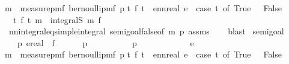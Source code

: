 \begin{isabellebody}
{\isachardoublequoteopen}m\ {\isacharequal}{\kern0pt}\ measure{\isacharunderscore}{\kern0pt}pmf\ {\isacharparenleft}{\kern0pt}bernoulli{\isacharunderscore}{\kern0pt}pmf\ p{}{\isacharparenright}{\kern0pt}{\isachardoublequoteclose}\isanewline
{\isachardoublequoteopen}{\isasymAnd}t{\isachardot}{\kern0pt}\ f\ t\ {\isacharequal}{\kern0pt}\ ennreal\ e\ {\isacharasterisk}{\kern0pt}\ {\isacharparenleft}{\kern0pt}case\ t\ of\ True\ {\isasymRightarrow}\ {}{\isacharbar}{\kern0pt}\ False\ {\isasymRightarrow}\ {}{\isacharparenright}{\kern0pt}{\isachardoublequoteclose}\isanewline
{}\ {\isachardoublequoteopen}{\isasymintegral}\isactrlsup {\isacharplus}{\kern0pt}\ t{\isachardot}{\kern0pt}\ {\isacharparenleft}{\kern0pt}f\ t{\isacharparenright}{\kern0pt}\ {\isasympartial}m\ {\isacharequal}{\kern0pt}\ integral\isactrlsup S\ m\ f{\isachardoublequoteclose}\isanewline
%
\isadelimproof
\ \ %
\endisadelimproof
%
\isatagproof
{}\isamarkupfalse%
\ nn{\isacharunderscore}{\kern0pt}integral{\isacharunderscore}{\kern0pt}eq{\isacharunderscore}{\kern0pt}simple{\isacharunderscore}{\kern0pt}integral\ semi{\isacharunderscore}{\kern0pt}goal{}{}{\isacharunderscore}{\kern0pt}false{\isacharbrackleft}{\kern0pt}of\ m\ p{}{\isacharbrackright}{\kern0pt}\ assms\isanewline
\ \ \isamarkupfalse%
\ blast%
\endisatagproof
{\isafoldproof}%
%
\isadelimproof
\isanewline
%
\endisadelimproof
\isanewline
\isanewline
{}\isamarkupfalse%
\ semi{\isacharunderscore}{\kern0pt}goal{}{\isacharcolon}{\kern0pt}\isanewline
\ \ \ p{}\ e{\isacharcolon}{\kern0pt}{\isacharcolon}{\kern0pt}real\ \ f\isanewline
\ \ \ \ {\isachardoublequoteopen}{}\ {\isasymle}\ p{}{\isachardoublequoteclose}\isanewline
\ \ \ \ \ \ \ \ \ \ {\isachardoublequoteopen}p{}\ {\isasymle}\ {}{\isachardoublequoteclose}\isanewline
\ \ \ \ \ \ \ \ \ \ {\isachardoublequoteopen}e\ {\isasymge}\ {}{\isachardoublequoteclose}\isanewline
{\isachardoublequoteopen}m\ {\isacharequal}{\kern0pt}\ measure{\isacharunderscore}{\kern0pt}pmf\ {\isacharparenleft}{\kern0pt}bernoulli{\isacharunderscore}{\kern0pt}pmf\ p{}{\isacharparenright}{\kern0pt}{\isachardoublequoteclose}\isanewline
{\isachardoublequoteopen}{\isasymAnd}t{\isachardot}{\kern0pt}\ f\ t\ {\isacharequal}{\kern0pt}\ ennreal\ e\ {\isacharasterisk}{\kern0pt}\ {\isacharparenleft}{\kern0pt}case\ t\ of\ True\ {\isasymRightarrow}\ {}{\isacharbar}{\kern0pt}\ False\ {\isasymRightarrow}\ {}{\isacharparenright}{\kern0pt}{\isachardoublequoteclose}\isanewline

\end{isabellebody}
